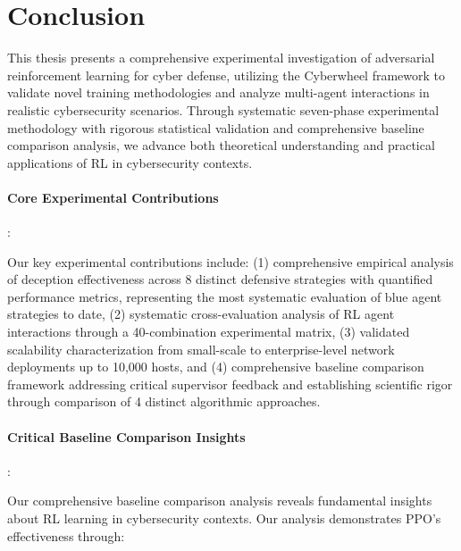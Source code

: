 \documentclass[12pt,oneside]{article}
\begin{document}
\clearpage
\section{Conclusion}

This thesis presents a comprehensive experimental investigation of adversarial reinforcement learning for cyber defense, utilizing the Cyberwheel framework to validate novel training methodologies and analyze multi-agent interactions in realistic cybersecurity scenarios. Through systematic seven-phase experimental methodology with rigorous statistical validation and comprehensive baseline comparison analysis, we advance both theoretical understanding and practical applications of RL in cybersecurity contexts.

\paragraph{Core Experimental Contributions}:

Our key experimental contributions include: (1) comprehensive empirical analysis of deception effectiveness across 8 distinct defensive strategies with quantified performance metrics, representing the most systematic evaluation of blue agent strategies to date, (2) systematic cross-evaluation analysis of RL agent interactions through a 40-combination experimental matrix, (3) validated scalability characterization from small-scale to enterprise-level network deployments up to 10,000 hosts, and (4) comprehensive baseline comparison framework addressing critical supervisor feedback and establishing scientific rigor through comparison of 4 distinct algorithmic approaches.

\paragraph{Critical Baseline Comparison Insights}:

Our comprehensive baseline comparison analysis reveals fundamental insights about RL learning in cybersecurity contexts. Our analysis demonstrates PPO's effectiveness through:
\end{document}
